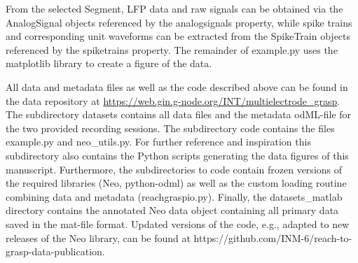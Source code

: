 {From the selected Segment, LFP data and raw signals can be obtained via the AnalogSignal objects referenced by the analogsignals property, while spike trains and corresponding unit waveforms can be extracted from the SpikeTrain objects referenced by the spiketrains property. The remainder of example.py uses the matplotlib library to create a figure of the data.

All data and metadata files as well as the code described above can be found in the data repository at \url{https://web.gin.g-node.org/INT/multielectrode_grasp}. The subdirectory datasets contains all data files and the metadata odML-file for the two provided recording sessions. The subdirectory code contains the files example.py and neo\_utils.py. For further reference and inspiration this subdirectory also contains the Python scripts generating the data figures of this manuscript. Furthermore, the subdirectories to code contain frozen versions of the required libraries (Neo, python-odml) as well as the custom loading routine combining data and metadata (reachgraspio.py). Finally, the datasets\_matlab directory contains the annotated Neo data object containing all primary data saved in the mat-file format. Updated versions of the code, e.g., adapted to new releases of the Neo library, can be found at https://github.com/INM-6/reach-to-grasp-data-publication.
}

